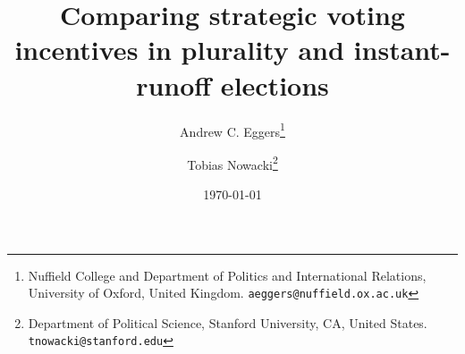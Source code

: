 \documentclass[11pt, letter]{article}
\begin{document}
\author{Andrew C. Eggers\thanks{Nuffield College and Department of Politics and International Relations, University of Oxford, United Kingdom. \texttt{aeggers@nuffield.ox.ac.uk}}
\and
Tobias Nowacki\thanks{Department of Political Science, Stanford University, CA, United States. \texttt{tnowacki@stanford.edu}}}
\date{\today}
\title{Comparing strategic voting incentives in plurality and instant-runoff elections}

\maketitle

\doublespacing %

\setcounter{section}{3}



\end{document}
